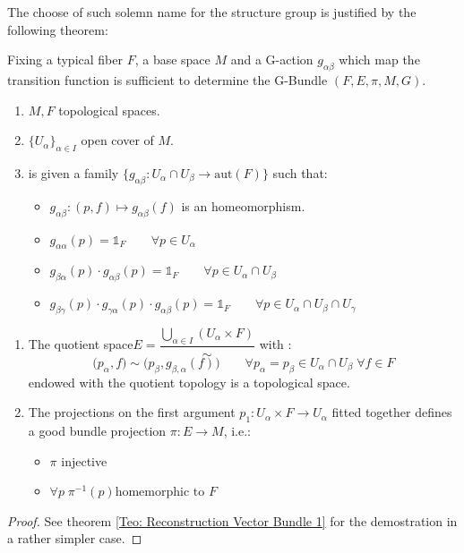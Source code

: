 \documentclass[a4paper,12pt]{scrartcl}    %
\begin{document}
The choose of such solemn name for the structure group is justified by the following theorem:
\begin{theorem}\cite{freed}
Fixing a typical fiber $F$, a base space $M$ and a G-action $g_{\alpha \beta}$ which map the transition function is sufficient to determine the G-Bundle $(F,E,\pi,M,G )$.
	\begin{hypothesis}
			\begin{enumerate}
				\item $M,F$ topological spaces. 
				\item $\{U_{\alpha}\}_{\alpha \in I} $ open cover of $M$.
				\item is given a family  $\{ g_{\alpha \beta} : U_{\alpha} \cap U_{\beta} \rightarrow \textrm{aut}(F) \}$ such that:
					\begin{itemize}
					\item $ g_{\alpha \beta} : (p,f) \mapsto g_{\alpha \beta}(f) $ is an homeomorphism.
					\item $g_{ \alpha \alpha} (p) = \mathds{1}_{F}  \qquad \forall p \in U_{\alpha}$
					\item $g_{ \beta \alpha} (p) \cdot g_{ \alpha \beta} (p) = \mathds{1}_{F}  \qquad \forall p \in U_{\alpha} \cap U_{\beta}$
					\item $g_{ \beta \gamma} (p) \cdot g_{ \gamma \alpha} (p)  \cdot g_{  \alpha  \beta} (p) = \mathds{1}_{F} \qquad \forall p \in U_{\alpha} \cap U_{\beta} \cap U_{\gamma}$
					\end{itemize}
			\end{enumerate}
	\end{hypothesis}
	
	\begin{thesis}
			\begin{enumerate}
				\item The quotient space$ E = \dfrac{\bigcup_{\alpha \in I} (U_{\alpha}\times F)}{\sim}$ with : 
				$$ \big( p_{\alpha}, f \big) \sim \big( p_{\beta}, g_{\beta,\alpha}(f) \big) \qquad \forall p_{\alpha}= p_{\beta} \in U_{\alpha} \cap U_{\beta} \; \forall f\in F  $$
				endowed with the quotient topology is a topological space.
				\item The projections on the first argument $p_1 :  U_{\alpha} \times F \rightarrow U_{\alpha}$ fitted together defines a good bundle projection $\pi :E \rightarrow M$, i.e.:
					\begin{itemize}
					\item $\pi$ injective
					\item $\forall p \; \pi^{-1}(p) \textrm{homemorphic to } F$
					\end{itemize}
			\end{enumerate}
	\end{thesis}

\end{theorem}
\begin{proof}
See theorem \ref{Teo: Reconstruction Vector Bundle 1} for the demostration in a rather simpler case.
\end{proof}
\end{document}
